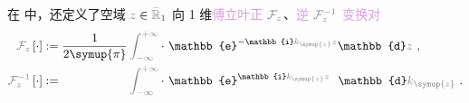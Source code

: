 在  中，还定义了空域 $\mathcolor{gray}{z} \in \mathcolor{gray}{\bar{\mathbb{R}}_{\textcolor{Plum}{1}}}$ 向 1 维\textcolor{Plum}{傅立叶正} $\mathcolor{gray}{\mathcal F_{z}}$、\textcolor{Plum}{逆} $\mathcolor{gray}{\mathcal F_{z}^{-1}}$ \textcolor{Plum}{变换对}
\begin{subequations} \label{eq:FT-z_kz}
\begin{align}
	\mathcolor{gray}{\mathcal F_{z}} \left[ \cdot \right] &:= \frac{ 1 }{ 2\symup{\pi} } \mathcolor{gray}{\int_{-\infty}^{+\infty}} \cdot~ \mathbb{e}^{-\mathbb{i}\mathcolor{gray}{k_{\symup{z}}} \mathcolor{gray}{z}} \mathbb{d}\mathcolor{gray}{z} ~, \label{eq:FT-kz} \\
	\mathcolor{gray}{\mathcal F_{z}^{-1}} \left[ \cdot \right] &:= \hphantom{\frac{ 1 }{ 2\symup{\pi} }} \mathcolor{gray}{\int_{-\infty}^{+\infty}} \cdot~ \mathbb{e}^{\mathbb{i}\mathcolor{gray}{k_{\symup{z}}} \mathcolor{gray}{z}} \hphantom{^-} \mathbb{d}\mathcolor{gray}{k_{\symup{z}}} ~. \label{eq:IFT-z}
\end{align}
\end{subequations}

